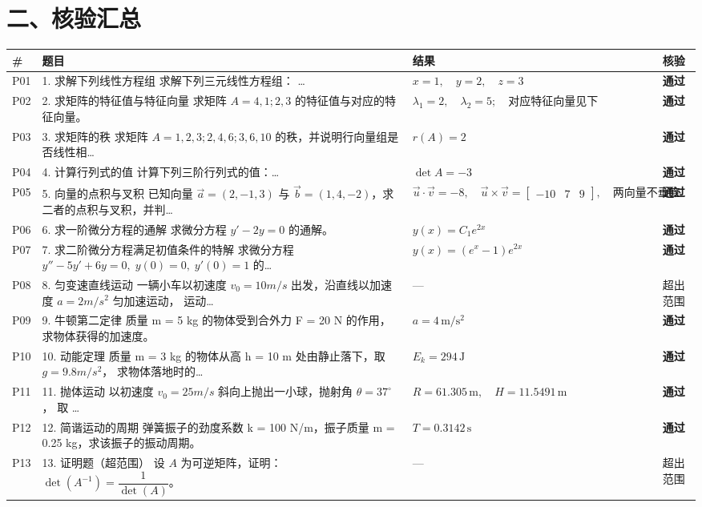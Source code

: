 \documentclass[11pt]{article}
\begin{document}
\section*{二、核验汇总}
\begin{center}\small
\begin{tabular}{p{0.5cm}p{6.2cm}p{3.4cm}p{3.0cm}}
\toprule
\# & 题目 & 结果 & 核验 \\
\midrule
P01 & 1. 求解下列线性方程组 求解下列三元线性方程组： … & $x = 1,\quad y = 2,\quad z = 3$ & \textcolor{okgreen}{\textbf{通过}} \\
P02 & 2. 求矩阵的特征值与特征向量 求矩阵 $A = 4 , 1 ; 2 , 3$ 的特征值与对应的特征向量。 & $\lambda_{1}=2,\quad \lambda_{2}=5;\quad \text{对应特征向量见下}$ & \textcolor{okgreen}{\textbf{通过}} \\
P03 & 3. 求矩阵的秩 求矩阵 $A = 1 , 2 , 3 ; 2 , 4 , 6 ; 3 , 6 , 10$ 的秩，并说明行向量组是否线性相… & $r(A)=2$ & \textcolor{okgreen}{\textbf{通过}} \\
P04 & 4. 计算行列式的值 计算下列三阶行列式的值：… & $\det A=-3$ & \textcolor{okgreen}{\textbf{通过}} \\
P05 & 5. 向量的点积与叉积 已知向量 $\vec{a}=(2,-1,3)$ 与 $\vec{b}=(1,4,-2)$，求二者的点积与叉积，并判… & $\vec{u}\cdot\vec{v}=-8,\quad \vec{u}\times\vec{v}=\left[\begin{matrix}-10 & 7 & 9\end{matrix}\right],\quad \text{两向量不垂直}$ & \textcolor{okgreen}{\textbf{通过}} \\
P06 & 6. 求一阶微分方程的通解 求微分方程 $y' - 2y = 0$ 的通解。 & $y{\left(x \right)} = C_{1} e^{2 x}$ & \textcolor{okgreen}{\textbf{通过}} \\
P07 & 7. 求二阶微分方程满足初值条件的特解 求微分方程 $y'' - 5y' + 6y = 0,\; y(0)=0,\; y'(0)=1$ 的… & $y{\left(x \right)} = \left(e^{x} - 1\right) e^{2 x}$ & \textcolor{okgreen}{\textbf{通过}} \\
P08 & 8. 匀变速直线运动 一辆小车以初速度 $v_0 = 10 m/s$ 出发，沿直线以加速度 $a = 2 m/s^2$ 匀加速运动， 运动… & $—$ & 超出范围 \\
P09 & 9. 牛顿第二定律 质量 m = 5 kg 的物体受到合外力 F = 20 N 的作用，求物体获得的加速度。 & $a=4\,\mathrm{m/s^2}$ & \textcolor{okgreen}{\textbf{通过}} \\
P10 & 10. 动能定理 质量 m = 3 kg 的物体从高 h = 10 m 处由静止落下，取 $g = 9.8 m/s^2$， 求物体落地时的… & $E_k=294\,\mathrm{J}$ & \textcolor{okgreen}{\textbf{通过}} \\
P11 & 11. 抛体运动 以初速度 $v_0 = 25 m/s$ 斜向上抛出一小球，抛射角 $\theta = 37^\circ$， 取 … & $R=61.305\,\mathrm{m},\quad H=11.5491\,\mathrm{m}$ & \textcolor{okgreen}{\textbf{通过}} \\
P12 & 12. 简谐运动的周期 弹簧振子的劲度系数 k = 100 N/m，振子质量 m = 0.25 kg，求该振子的振动周期。 & $T=0.3142\,\mathrm{s}$ & \textcolor{okgreen}{\textbf{通过}} \\
P13 & 13. 证明题（超范围） 设 $A$ 为可逆矩阵，证明：$\det(A^{-1}) = \dfrac{1}{\det(A)}$。 & $—$ & 超出范围 \\
\bottomrule
\end{tabular}
\end{center}
\vspace{6pt}
\par
\end{document}
